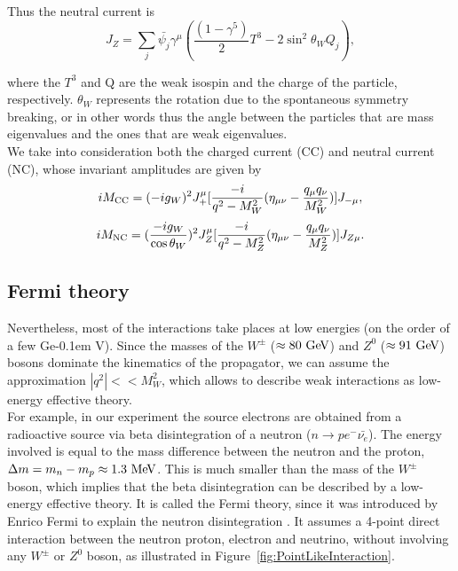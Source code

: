 \documentclass[10pt,swedish, openany]{book}
\def\MeV{\ifmmode {\mathrm{\ Me\kern -0.1em V}}\else
                   \textrm{Me\kern -0.1em V}\fi}%
\def\GeV{\ifmmode {\mathrm{\ Ge\kern -0.1em V}}\else
                   \textrm{Ge\kern -0.1em V}\fi}%
\begin{document}
Thus the neutral current is
\begin{equation}
    J_Z = \sum_j \bar{\psi_j}\gamma^{\mu} (\frac{(1-\gamma^5)}{2}T^3 - 2\sin^2{\theta_W}Q_j), 
\end{equation}

where the $T^3$ and Q are the weak isospin and the charge of the particle, respectively. $\theta_W$ represents the rotation due to the spontaneous symmetry breaking, or in other words thus the angle between the particles that are mass eigenvalues and the ones that are weak eigenvalues.\\

We take into consideration both the charged current (CC) and neutral current (NC), whose invariant amplitudes are given by
\begin{equation}
    i M_{\rm CC} = (-i g_W)^2 J^{\mu}_+ [\frac{-i}{q^2-M^2_W}(\eta_{\mu\nu}-\frac{q_{\mu}q_{\nu}}{M^2_W})] J_{- \mu},
\end{equation}
\begin{equation}
    i M_{\rm NC} = (\frac{-i g_W}{\cos{\theta_W}})^2 J^{\mu}_Z [\frac{-i}{q^2-M^2_Z}(\eta_{\mu\nu}-\frac{q_{\mu}q_{\nu}}{M^2_Z})] J_{Z \mu}.
\end{equation}

\subsection{Fermi theory}

Nevertheless, most of the interactions take places at low energies (on the order of a few \GeV). Since the masses of the  $W^\pm$ ($\approx 80 \GeV$) and $Z^0$ ($\approx 91 \GeV$) bosons dominate the kinematics of the propagator, we can assume the approximation $|q^2| << M^2_W$, which allows to describe weak interactions as low-energy effective theory. \\

For example, in our experiment the source electrons are obtained from a radioactive source via beta disintegration of a neutron ($n \rightarrow p e^- \bar{\nu_e}$). The energy involved is equal to the mass difference between the neutron and the proton, $\Delta m = m_n - m_p \approx 1.3 \MeV$. This is much smaller than the mass of the $W^\pm$  boson, which implies that the beta disintegration can be described by a low-energy effective theory. It is called the Fermi theory, since it was introduced by Enrico Fermi to explain the neutron disintegration . It assumes a 4-point direct interaction between the neutron proton, electron and neutrino, without involving any $W^\pm$ or  $Z^0$ boson, as illustrated in Figure~\ref{fig:PointLikeInteraction}. \\
\end{document}
